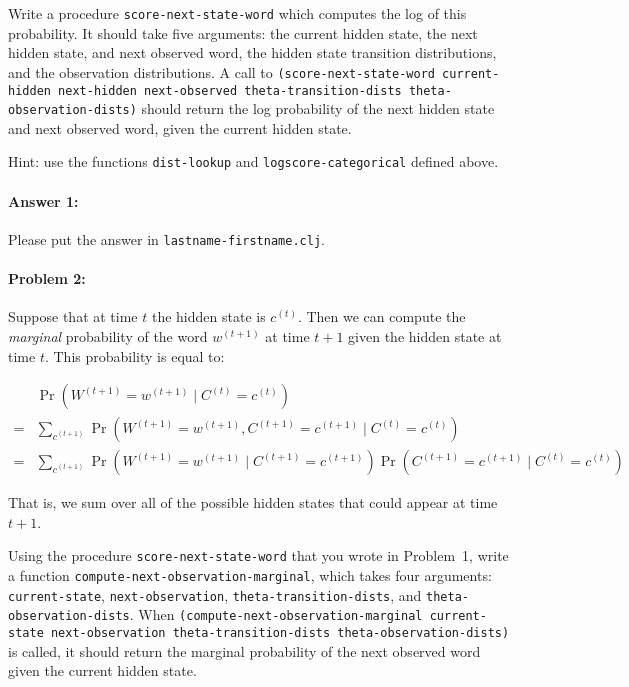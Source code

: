 \documentclass[10pt]{article}
\begin{document}
  Write a procedure \texttt{score-next-state-word} which computes the
  log of this probability. It should take five arguments: the current
  hidden state, the next hidden state, and next observed word, the
  hidden state transition distributions, and the observation
  distributions. A call to \texttt{(score-next-state-word
    current-hidden next-hidden next-observed theta-transition-dists
    theta-observation-dists)} should return the log probability of the
  next hidden state and next observed word, given the current hidden
  state.

  \noindent Hint: use the functions \texttt{dist-lookup} and
  \texttt{logscore-categorical} defined above.

\paragraph{Answer 1:} Please put the answer in
\texttt{lastname-firstname.clj}.


\hrulefill
\paragraph{Problem 2:}

Suppose that at time $t$ the hidden state is $c^{(t)}$. Then we can
compute the \emph{marginal} probability of the word $w^{(t+1)}$ at
time $t+1$ given the hidden state at time $t$. This probability is
equal to:

$$\begin{align}
&\Pr(W^{(t+1)} = w^{(t+1)} \mid C^{(t)} = c^{(t)}) \\ 
=&\sum_{c^{(t+1)}} \Pr(W^{(t+1)} = w^{(t+1)}, C^{(t+1)} =c^{(t+1)} \mid C^{(t)} = c^{(t)})\\
=&\sum_{c^{(t+1)}} \Pr(W^{(t+1)} = w^{(t+1)} \mid C^{(t+1)}=c^{(t+1)}) \Pr(C^{(t+1)} =c^{(t+1)} \mid C^{(t)} = c^{(t)})
\end{align}$$

That is, we sum over all of the possible hidden states that could
appear at time $t+1$.

Using the procedure \texttt{score-next-state-word} that you wrote in
Problem~1, write a function
\texttt{compute-next-observation-marginal}, which takes four
arguments: \texttt{current-state}, \texttt{next-observation},
\texttt{theta-transition-dists}, and
\texttt{theta-observation-dists}. When
\texttt{(compute-next-observation-marginal current-state
  next-observation theta-transition-dists theta-observation-dists)} is
called, it should return the marginal probability of the next observed
word given the current hidden state.
\end{document}
